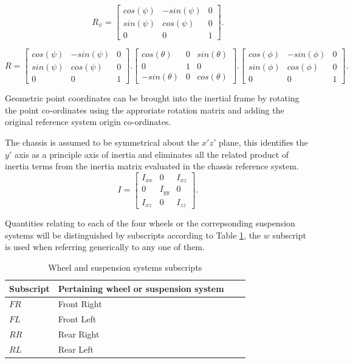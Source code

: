 $$
R_\psi = \begin{bmatrix}
cos(\psi) & -sin(\psi)      & 0\\
sin(\psi) & cos(\psi) & 0     \\
0 & 0      & 1
\end{bmatrix}.
$$

$$
R = \begin{bmatrix}
cos(\psi) & -sin(\psi)      & 0\\
sin(\psi) & cos(\psi) & 0     \\
0 & 0      & 1
\end{bmatrix}.\begin{bmatrix}
cos(\theta) & 0      & sin(\theta) \\
0 & 1 & 0  \\
-sin(\theta) & 0 & cos(\theta)
\end{bmatrix}.\begin{bmatrix}
cos(\phi) & -sin(\phi)      & 0\\
sin(\phi) & cos(\phi) & 0     \\
0 & 0      & 1
\end{bmatrix}.
$$

Geometric point coordinates can be brought into the inertial frame by rotating the point co-ordinates using the approriate rotation matrix and adding the original reference system origin co-ordinates.

The chassis is assumed to be symmetrical about the $x'z'$ plane, this identifies the $y'$ axis as a principle axis of inertia and eliminates all the related product of inertia terms from the inertia matrix evaluated in the chassis reference system.
$$
I = \begin{bmatrix}
I_{xx} & 0      & I_{xz}\\
0      & I_{yy} & 0     \\
I_{xz} & 0      & I_{zz}
\end{bmatrix}.
$$

Quantities relating to each of the four wheels or the correpsonding suspension systems will be distinguished by subscripts according to Table \ref{table:subscripts}, the $w$ subscript is used when referring generically to any one of them.

\begin{table}[ht]
  \caption{Wheel and suspension systems subscripts} %
  \centering %
  \begin{tabular}{l l l l} %
    \hline\hline %
    Subscript & Pertaining wheel or suspension system \\ [0.5ex] %
    \hline %
    $FR$ & Front Right \\ %
    $FL$ & Front Left \\
    $RR$ & Rear Right \\
    $RL$ & Rear Left \\ [1ex] %
    \hline %
  \end{tabular}
  \label{table:subscripts} %
\end{table}


